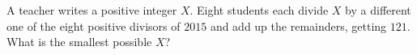 A teacher writes a positive integer $X$. Eight students each divide $X$ by a different one of the eight positive divisors of $2015$ and add up the remainders, getting $121$. What is the smallest possible $X$?
